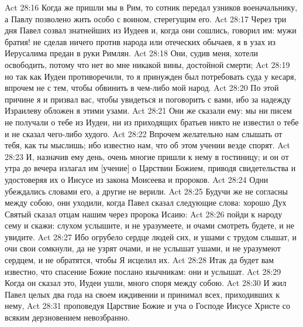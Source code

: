 Act 28:16  Когда же пришли мы в Рим, то сотник передал узников военачальнику, а Павлу позволено жить особо с воином, стерегущим его.
Act 28:17  Через три дня Павел созвал знатнейших из Иудеев и, когда они сошлись, говорил им: мужи братия! не сделав ничего против народа или отеческих обычаев, я в узах из Иерусалима предан в руки Римлян.
Act 28:18  Они, судив меня, хотели освободить, потому что нет во мне никакой вины, достойной смерти;
Act 28:19  но так как Иудеи противоречили, то я принужден был потребовать суда у кесаря, впрочем не с тем, чтобы обвинить в чем-либо мой народ.
Act 28:20  По этой причине я и призвал вас, чтобы увидеться и поговорить с вами, ибо за надежду Израилеву обложен я этими узами.
Act 28:21  Они же сказали ему: мы ни писем не получали о тебе из Иудеи, ни из приходящих братьев никто не известил о тебе и не сказал чего-либо худого.
Act 28:22  Впрочем желательно нам слышать от тебя, как ты мыслишь; ибо известно нам, что об этом учении везде спорят.
Act 28:23  И, назначив ему день, очень многие пришли к нему в гостиницу; и он от утра до вечера излагал им [учение] о Царствии Божием, приводя свидетельства и удостоверяя их о Иисусе из закона Моисеева и пророков.
Act 28:24  Одни убеждались словами его, а другие не верили.
Act 28:25  Будучи же не согласны между собою, они уходили, когда Павел сказал следующие слова: хорошо Дух Святый сказал отцам нашим через пророка Исаию:
Act 28:26  пойди к народу сему и скажи: слухом услышите, и не уразумеете, и очами смотреть будете, и не увидите.
Act 28:27  Ибо огрубело сердце людей сих, и ушами с трудом слышат, и очи свои сомкнули, да не узрят очами, и не услышат ушами, и не уразумеют сердцем, и не обратятся, чтобы Я исцелил их.
Act 28:28  Итак да будет вам известно, что спасение Божие послано язычникам: они и услышат.
Act 28:29  Когда он сказал это, Иудеи ушли, много споря между собою.
Act 28:30  И жил Павел целых два года на своем иждивении и принимал всех, приходивших к нему,
Act 28:31  проповедуя Царствие Божие и уча о Господе Иисусе Христе со всяким дерзновением невозбранно.


